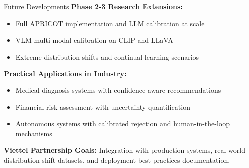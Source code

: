 \documentclass[aspectratio=169]{beamer}
\begin{document}
\begin{frame}{Future Developments}
\textbf{Phase 2-3 Research Extensions:}
\begin{itemize}
\item Full APRICOT implementation and LLM calibration at scale
\item VLM multi-modal calibration on CLIP and LLaVA
\item Extreme distribution shifts and continual learning scenarios
\end{itemize}

\vspace{0.3cm}
\textbf{Practical Applications in Industry:}
\begin{itemize}
\item Medical diagnosis systems with confidence-aware recommendations
\item Financial risk assessment with uncertainty quantification
\item Autonomous systems with calibrated rejection and human-in-the-loop mechanisms
\end{itemize}

\vspace{0.3cm}
\textbf{Viettel Partnership Goals:}
Integration with production systems, real-world distribution shift datasets, and deployment best practices documentation.
\end{frame}
\end{document}

